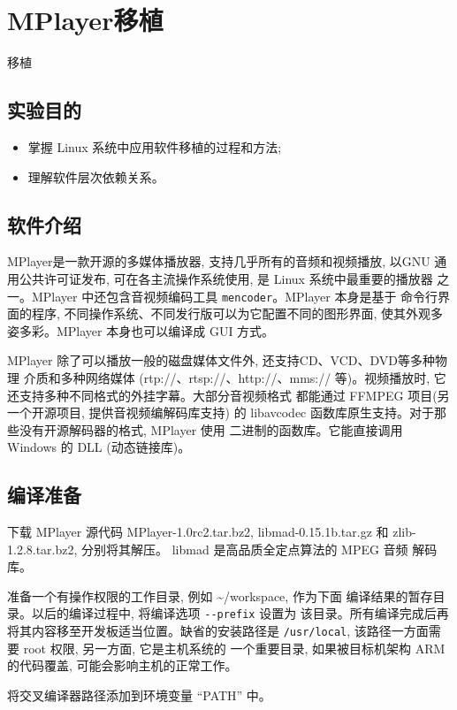 \chapter{MPlayer移植}{移植}

\section{实验目的}
\begin{itemize}
    \item 掌握 Linux 系统中应用软件移植的过程和方法;
    \item 理解软件层次依赖关系。
\end{itemize}

\section{软件介绍}

MPlayer是一款开源的多媒体播放器, 支持几乎所有的音频和视频播放, 以GNU
通用公共许可证发布, 可在各主流操作系统使用, 是 Linux 系统中最重要的播放器
之一。MPlayer 中还包含音视频编码工具 \verb|mencoder|。MPlayer 本身是基于
命令行界面的程序, 不同操作系统、不同发行版可以为它配置不同的图形界面,
使其外观多姿多彩。MPlayer 本身也可以编译成 GUI 方式。

MPlayer 除了可以播放一般的磁盘媒体文件外, 还支持CD、VCD、DVD等多种物理
介质和多种网络媒体 (rtp://、rtsp://、http://、mms:// 等)。视频播放时,
它还支持多种不同格式的外挂字幕。大部分音视频格式
都能通过 FFMPEG 项目(另一个开源项目, 提供音视频编解码库支持) 的
libavcodec 函数库原生支持。对于那些没有开源解码器的格式, MPlayer 使用
二进制的函数库。它能直接调用 Windows 的 DLL (动态链接库)。

\section{编译准备}

下载 MPlayer 源代码 MPlayer-1.0rc2.tar.bz2, libmad-0.15.1b.tar.gz 和
zlib-1.2.8.tar.bz2, 分别将其解压。 libmad 是高品质全定点算法的 MPEG 音频
解码库。

准备一个有操作权限的工作目录, 例如 \textasciitilde/workspace, 作为下面
编译结果的暂存目录。以后的编译过程中, 将编译选项 \verb|--prefix| 设置为
该目录。所有编译完成后再将其内容移至开发板适当位置。缺省的安装路径是
\verb|/usr/local|, 该路径一方面需要 root 权限, 另一方面, 它是主机系统的
一个重要目录, 如果被目标机架构 ARM 的代码覆盖, 可能会影响主机的正常工作。

将交叉编译器路径添加到环境变量 ``PATH'' 中。

